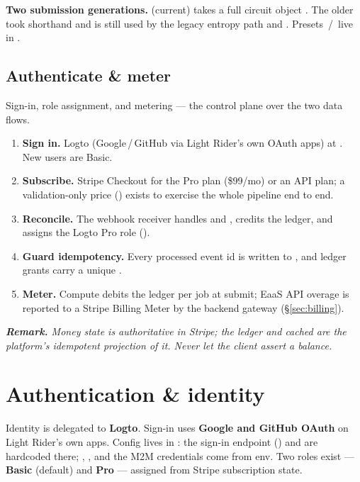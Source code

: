 \documentclass[11pt]{article}
\newenvironment{remark}
  {\par\medskip\noindent\small\itshape\textbf{\upshape Remark.}\hspace{0.4em}\ignorespaces}
  {\par\medskip}
\begin{document}
\noindent\textbf{Two submission generations.}\enspace {} (current) takes a full circuit object
. The older  took  shorthand and
is still used by the legacy entropy path and . Presets \,/\, live in
.

\subsection{Authenticate \& meter}
Sign-in, role assignment, and metering --- the control plane over the two data flows.
\begin{enumerate}
\item \textbf{Sign in.} Logto (Google\,/\,GitHub via Light Rider's own OAuth apps) at . New
users are Basic.
\item \textbf{Subscribe.} Stripe Checkout for the Pro plan (\$99/mo) or an API plan; a validation-only price
() exists to exercise the whole pipeline end to end.
\item \textbf{Reconcile.} The webhook receiver handles  and
, credits the ledger, and assigns the Logto Pro role
().
\item \textbf{Guard idempotency.} Every processed event id is written to , and ledger grants
carry a unique .
\item \textbf{Meter.} Compute debits the ledger per job at submit; EaaS API overage is reported to a Stripe Billing Meter
by the backend gateway (\S\ref{sec:billing}).
\end{enumerate}

\begin{remark}
Money state is authoritative in Stripe; the ledger and cached  are the platform's idempotent
projection of it. Never let the client assert a balance.
\end{remark}

\section{Authentication \& identity}\label{sec:auth}
Identity is delegated to \textbf{Logto}. Sign-in uses \textbf{Google and GitHub OAuth} on Light Rider's own apps. Config
lives in : the sign-in endpoint () and  are hardcoded there;
, , and the M2M credentials come from env. Two roles exist ---
\textbf{Basic} (default) and \textbf{Pro} --- assigned from Stripe subscription state.
\end{document}
